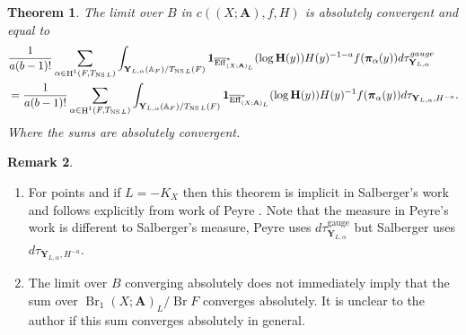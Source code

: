\documentclass[a4paper,11pt,reqno]{amsart}
\newcommand{\A}{\mathbb{A}}
\DeclareMathOperator{\NS}{NS}
\DeclareMathOperator{\Eff}{\overline{Eff}}
\DeclareMathOperator{\Br}{Br}
\DeclareMathOperator{\HH}{H}
\newtheorem{theorem}{Theorem}[section]
\theoremstyle{definition}
\newtheorem{remark}[theorem]{Remark}
\begin{document}
\begin{theorem}\label{thm:Peyre's constant in terms of Brauer-Manin obstruction}
	The limit over $B$ in $c((X ; \mathbf{A}), f, H)$ is absolutely convergent and equal to
	\[
	\begin{split}
		&\frac{1}{a (b - 1)!}\sum_{\alpha \in \HH^1(F, T_{\NS L})} \int_{\mathbf{Y}_{L, \alpha}(\A_F)/T_{\NS L}(F)} \mathbf{1}_{\Eff_{(X; \mathbf{A})_L}^*}(\log \mathbf{H}(y)) H(y)^{-1 - a} f(\bm{\pi}_{\alpha}(y))d\tau_{\mathbf{Y}_{L, \alpha}}^{\emph{gauge}} \\
		& = 
		\frac{1}{a (b - 1)!}\sum_{\alpha \in \HH^1(F, T_{\NS L})} \int_{\mathbf{Y}_{L, \alpha}(\A_F)/T_{\NS L}(F)} \mathbf{1}_{\Eff_{(X; \mathbf{A})_L}^*}(\log \mathbf{H}(y)) H(y)^{-1} f(\bm{\pi}_{\alpha}(y))d\tau_{\mathbf{Y}_{L, \alpha}, H^{-a}}.
	\end{split}
	\]
	Where the sums are absolutely convergent.
\end{theorem}
\begin{remark} \hfill
	\begin{enumerate}
	\item For  points and if $L = -K_{X}$ then this theorem is implicit in Salberger's work \cite[Assertion~5.25]{Salberger1998Tamagawa} and follows explicitly from work of Peyre \cite[Thm.~5.3.1]{Peyre1998Terme}. Note that the measure in Peyre's work is different to Salberger's measure, Peyre uses $d\tau_{\mathbf{Y}_{L, \alpha}}^{\text{gauge}}$ but Salberger uses $d\tau_{\mathbf{Y}_{L, \alpha}, H^{-a}}$.
	\item The limit over $B$ converging absolutely does not immediately imply that the sum over $\Br_1 (X; \mathbf{A})_L/ \Br F$ converges absolutely. It is unclear to the author if this sum converges absolutely in general.
	\end{enumerate}
\end{remark}
\end{document}

